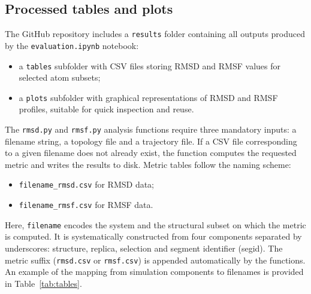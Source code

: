 \documentclass{article}
\begin{document}
\subsection{Processed tables and plots}

The GitHub repository includes a \texttt{results} folder containing all outputs produced by the \verb+evaluation.ipynb+ notebook:
\begin{itemize}
    \item a \texttt{tables} subfolder with CSV files storing RMSD and RMSF values for selected atom subsets;
    \item a \texttt{plots} subfolder with graphical representations of RMSD and RMSF profiles, suitable for quick inspection and reuse.
\end{itemize}

The \verb|rmsd.py| and \verb|rmsf.py| analysis functions require three mandatory inputs: a filename string, a topology file and a trajectory file.
If a CSV file corresponding to a given filename does not already exist, the function computes the requested metric and writes the results to disk.
Metric tables follow the naming scheme:
\begin{itemize}
    \item \texttt{filename\_rmsd.csv} for RMSD data;
    \item \texttt{filename\_rmsf.csv} for RMSF data.
\end{itemize}

Here, \texttt{filename} encodes the system and the structural subset on which the metric is computed.
It is systematically constructed from four components separated by underscores: structure, replica, selection and segment identifier (segid).
The metric suffix (\texttt{rmsd.csv} or \texttt{rmsf.csv}) is appended automatically by the functions.
An example of the mapping from simulation components to filenames is provided in Table~\ref{tab:tables}.
\end{document}
